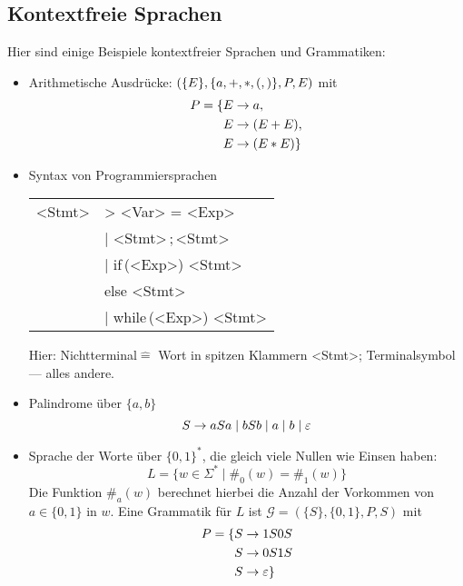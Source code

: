 \subsection{Kontextfreie Sprachen}
Hier sind einige Beispiele kontextfreier Sprachen und Grammatiken:
\begin{itemize}
\item Arithmetische Ausdrücke: $(\{E\}, \{a, \mathnormal{+}, \mathnormal{*}, \mathnormal{(}, \mathnormal{)}\}, P, E)$ mit
  \begin{displaymath}
    P =
    \begin{aligned}[t]
      \{ E &\->a, \\
        E &\->(E+E), \\
        E &\->(E*E) \}
    \end{aligned}
  \end{displaymath}
\item Syntax von Programmiersprachen%
	\begin{center}
		\begin{tabular}[t]{r@{ }l}
			<Stmt> &\-> <Var> = <Exp>\\
			&| <Stmt>\,;\,<Stmt>\\
			&| if\,(<Exp>) <Stmt>\\
			&\phantom{|} else <Stmt>\\
			&| while\,(<Exp>) <Stmt>
		\end{tabular}
	\end{center}%
	Hier: Nichtterminal$\hat=$ Wort in spitzen Klammern <Stmt>;
	Terminalsymbol --- alles andere.
\item Palindrome über $\{a,b\}$
	\[ S\-> aSa \mid bSb \mid a \mid b \mid \Eps \]
\item Sprache der Worte über $\{0,1\}^*$, die gleich viele Nullen wie Einsen haben:
  \begin{displaymath}
    L = \{ w \in \Sigma^* \mid \#_0(w) = \#_1(w)\}
  \end{displaymath}
  Die Funktion $\#_a(w)$ berechnet hierbei die Anzahl der Vorkommen von $a \in \{0, 1\}$ in $w$.
  Eine Grammatik für $L$ ist $\mathcal{G} = (\{S\}, \{0,1\}, P, S)$ mit
  \begin{displaymath}
    P =
    \begin{aligned}[t]
      \{ S & \to 1S0S \\
        S & \to 0S1S \\
        S & \to \varepsilon
      \}
    \end{aligned}
  \end{displaymath}


\end{itemize}
